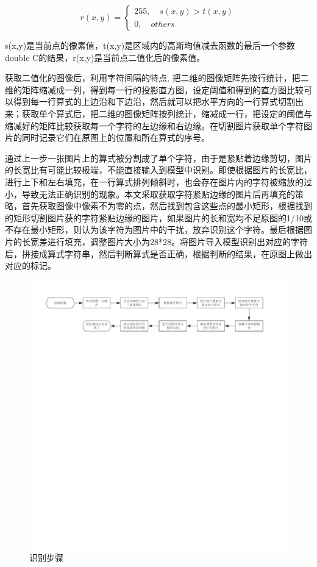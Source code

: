 \[ r(x,y)= \begin{cases}
255,\quad s(x,y)>t(x,y) \\
0,\quad others
\end{cases} \]
\par
s(x,y)是当前点的像素值，t(x,y)是区域内的高斯均值减去函数的最后一个参数double C的结果，r(x,y)是当前点二值化后的像素值。
\par
获取二值化的图像后，利用字符间隔的特点, 把二维的图像矩阵先按行统计，把二维的矩阵缩减成一列，得到每一行的投影直方图，设定阈值和得到的直方图比较可以得到每一行算式的上边沿和下边沿，然后就可以把水平方向的一行算式切割出来；获取单个算式后，把二维的图像矩阵按列统计，缩减成一行，把设定的阈值与缩减好的矩阵比较获取每一个字符的左边缘和右边缘。在切割图片获取单个字符图片的同时记录它们在原图上的位置和所在算式的序号。
\par
通过上一步一张图片上的算式被分割成了单个字符，由于是紧贴着边缘剪切，图片的长宽比有可能比较极端，不能直接输入到模型中识别。即使根据图片的长宽比，进行上下和左右填充，在一行算式排列倾斜时，也会存在图片内的字符被缩放的过小，导致无法正确识别的现象。本文采取获取字符紧贴边缘的图片后再填充的策略，首先获取图像中像素不为零的点，然后找到包含这些点的最小矩形，根据找到的矩形切割图片获的字符紧贴边缘的图片，如果图片的长和宽均不足原图的1/10或不存在最小矩形，则认为该字符为图片中的干扰，放弃识别这个字符。最后根据图片的长宽差进行填充，调整图片大小为28*28。将图片导入模型识别出对应的字符后，拼接成算式字符串，然后判断算式是否正确，根据判断的结果，在原图上做出对应的标记。
\begin{figure}[h!]
	\centering
	\includegraphics[width=350bp]{picture/cut.pdf}
	\caption{识别步骤}
	\label{fig:}
\end{figure}
\par

